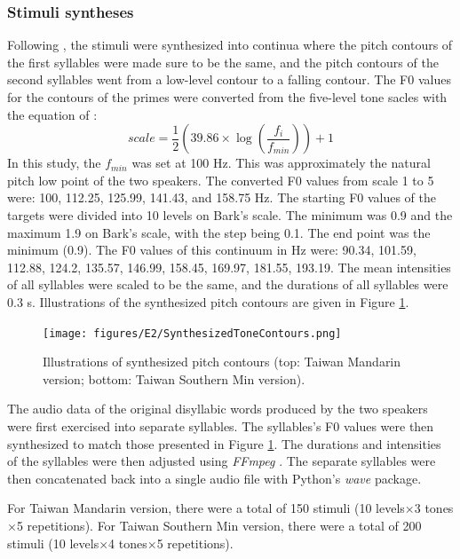\subsubsection{Stimuli syntheses}
Following \cite{Zhangetal2022}, the stimuli were synthesized into continua where the pitch contours of the first syllables were made sure to be the same, and the pitch contours of the second syllables went from a low-level contour to a falling contour. The F0 values for the contours of the primes were converted from the five-level tone sacles with the equation of \cite{FonChiang1999}:
\[scale = \dfrac{1}{2}(39.86\times \log (\dfrac{f_{i}}{f_{min}})) + 1\] In this study, the $f_{min}$ was set at 100 Hz. This was approximately the natural pitch low point of the two speakers. The converted F0 values from scale 1 to 5 were: 100, 112.25, 125.99, 141.43, and 158.75 Hz. The starting F0 values of the targets were divided into 10 levels on Bark's scale. The minimum was 0.9 and the maximum 1.9 on Bark's scale, with the step being 0.1. The end point was the minimum (0.9). The F0 values of this continuum in Hz were: 90.34, 101.59, 112.88, 124.2, 135.57, 146.99, 158.45, 169.97, 181.55, 193.19. The mean intensities of all syllables were scaled to be the same, and the durations of all syllables were 0.3 s. Illustrations of the synthesized pitch contours are given in Figure \ref{Figure:SynthesizedToneContours}.

\begin{figure}[h]
\centering
\texttt{[image: figures/E2/SynthesizedToneContours.png]}
\caption{Illustrations of synthesized pitch contours (top: Taiwan Mandarin version; bottom: Taiwan Southern Min version).}
\label{Figure:SynthesizedToneContours}
\end{figure}

The audio data of the original disyllabic words produced by the two speakers were first exercised into separate syllables. The syllables's F0 values were then synthesized to match those presented in Figure \ref{Figure:SynthesizedToneContours}. The durations and intensities of the syllables were then adjusted using \textit{FFmpeg} \citep{Tomar2006}. The separate syllables were then concatenated back into a single audio file with Python's \textit{wave} package.

For Taiwan Mandarin version, there were a total of 150 stimuli (10 levels$\times$3 tones$\times$5 repetitions). For Taiwan Southern Min version, there were a total of 200 stimuli (10 levels$\times$4 tones$\times$5 repetitions).

